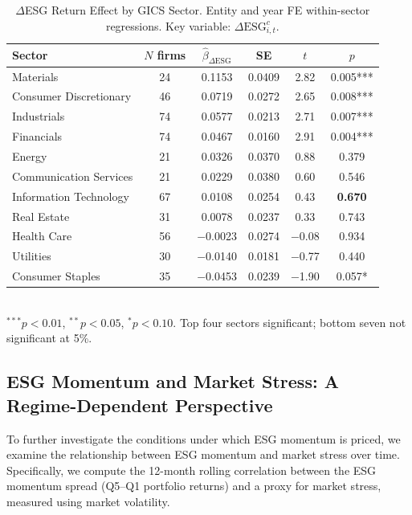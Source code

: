 \begin{table}[H]
  \centering
  \caption{$\Delta$ESG Return Effect by GICS Sector. Entity and year FE within-sector regressions. Key variable: $\Delta\mathrm{ESG}_{i,t}^c$.}
  \label{tab:sector}
  \begin{tabular}{lccccc}
    \toprule
    Sector & $N$ firms & $\hat{\beta}_{\Delta\mathrm{ESG}}$ & SE & $t$ & $p$ \\
    \midrule
    Materials              & 24 & 0.1153 & 0.0409 & 2.82 & 0.005*** \\
    Consumer Discretionary & 46 & 0.0719 & 0.0272 & 2.65 & 0.008*** \\
    Industrials            & 74 & 0.0577 & 0.0213 & 2.71 & 0.007*** \\
    Financials             & 74 & 0.0467 & 0.0160 & 2.91 & 0.004*** \\
    \midrule
    Energy                 & 21 & 0.0326 & 0.0370 & 0.88 & 0.379  \\
    Communication Services & 21 & 0.0229 & 0.0380 & 0.60 & 0.546  \\
    Information Technology & 67 & 0.0108 & 0.0254 & 0.43 & \textbf{0.670}  \\
    Real Estate            & 31 & 0.0078 & 0.0237 & 0.33 & 0.743  \\
    Health Care            & 56 & $-$0.0023 & 0.0274 & $-$0.08 & 0.934 \\
    Utilities              & 30 & $-$0.0140 & 0.0181 & $-$0.77 & 0.440 \\
    Consumer Staples       & 35 & $-$0.0453 & 0.0239 & $-$1.90 & 0.057* \\
    \bottomrule
  \end{tabular}
  \smallskip\\
  \footnotesize $^{***}p<0.01$, $^{**}p<0.05$, $^{*}p<0.10$. Top four sectors significant; bottom seven not significant at 5\%.
\end{table}

\subsection{ESG Momentum and Market Stress: A Regime-Dependent Perspective}

To further investigate the conditions under which ESG momentum is priced, we examine the relationship between ESG momentum and market stress over time. Specifically, we compute the 12-month rolling correlation between the ESG momentum spread (Q5–Q1 portfolio returns) and a proxy for market stress, measured using market volatility.

